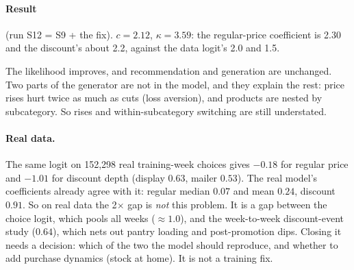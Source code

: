 \documentclass[11pt]{article}
\begin{document}
\paragraph{Result} (run S12 = S9 + the fix). $c=2.12$, $\kappa=3.59$: the regular-price coefficient
is 2.30 and the discount's about 2.2, against the data logit's 2.0 and 1.5.
\begin{center}\small
{}
\end{center}
The likelihood improves, and recommendation and generation are unchanged. Two parts of the
generator are not in the model, and they explain the rest: price rises hurt twice as much as cuts
(loss aversion), and products are nested by subcategory. So rises and within-subcategory switching
are still understated.

\paragraph{Real data.} The same logit on 152,298 real training-week choices gives $-0.18$ for regular
price and $-1.01$ for discount depth (display $0.63$, mailer $0.53$). The real model's coefficients
already agree with it: regular median $0.07$ and mean $0.24$, discount $0.91$. So on real data the
2$\times$ gap is \emph{not} this problem. It is a gap between the choice logit, which pools all
weeks ($\approx1.0$), and the week-to-week discount-event study ($0.64$), which nets out pantry
loading and post-promotion dips. Closing it needs a decision: which of the two the model should
reproduce, and whether to add purchase dynamics (stock at home). It is not a training fix.
\end{document}
